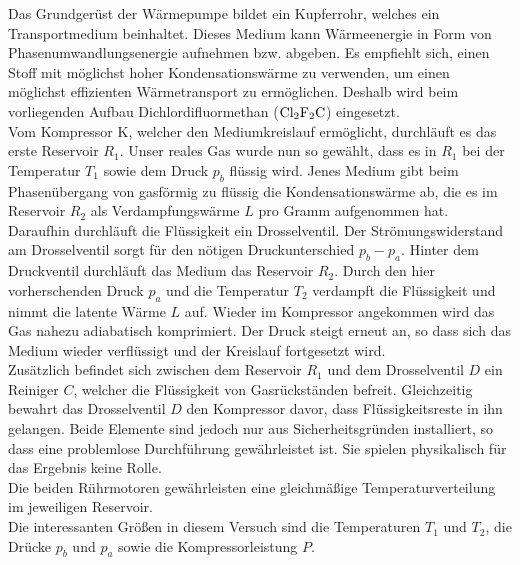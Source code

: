 Das Grundgerüst der Wärmepumpe bildet ein Kupferrohr, welches ein Transportmedium beinhaltet.
Dieses Medium kann Wärmeenergie in Form von Phasenumwandlungsenergie aufnehmen bzw. abgeben.
Es empfiehlt sich, einen Stoff mit möglichst hoher Kondensationswärme zu verwenden, um einen möglichst effizienten Wärmetransport zu ermöglichen.
Deshalb wird beim vorliegenden Aufbau Dichlordifluormethan ($\ce{Cl2F2C}$) eingesetzt.\\
Vom Kompressor K, welcher den Mediumkreislauf ermöglicht, durchläuft es das erste Reservoir $R_1$.
Unser reales Gas wurde nun so gewählt, dass es in $R_1$ bei der Temperatur $T_1$ sowie dem Druck $p_b$ flüssig wird.
Jenes Medium gibt beim Phasenübergang von gasförmig zu flüssig die Kondensationswärme ab, die es im Reservoir $R_2$ als Verdampfungswärme $L$ pro Gramm aufgenommen hat.
Daraufhin durchläuft die Flüssigkeit ein Drosselventil.
Der Strömungswiderstand am Drosselventil sorgt für den nötigen Druckunterschied $p_b-p_a$.
Hinter dem Druckventil durchläuft das Medium das Reservoir $R_2$.
Durch den hier vorherschenden Druck $p_a$ und die Temperatur $T_2$ verdampft die Flüssigkeit und nimmt die latente Wärme $L$ auf.
Wieder im Kompressor angekommen wird das Gas nahezu adiabatisch komprimiert.
Der Druck steigt erneut an, so dass sich das Medium wieder verflüssigt und der Kreislauf fortgesetzt wird.\\
Zusätzlich befindet sich zwischen dem Reservoir $R_1$ und dem Drosselventil $D$ ein Reiniger $C$, welcher die Flüssigkeit von Gasrückständen befreit.
Gleichzeitig bewahrt das Drosselventil $D$ den Kompressor davor, dass Flüssigkeitsreste in ihn gelangen.
Beide Elemente sind jedoch nur aus Sicherheitsgründen installiert, so dass eine problemlose Durchführung gewährleistet ist.
Sie spielen physikalisch für das Ergebnis keine Rolle.\\
Die beiden Rührmotoren gewährleisten eine gleichmäßige Temperaturverteilung im jeweiligen Reservoir.\\
Die interessanten Größen in diesem Versuch sind die Temperaturen $T_1$ und $T_2$, die Drücke $p_b$ und $p_a$ sowie die Kompressorleistung $P$.

